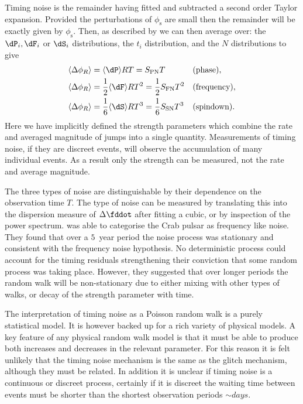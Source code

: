 Timing noise is the remainder having
fitted and subtracted a second order Taylor expansion. Provided the perturbations
of $\phi_{\mathrm{s}}$ are small then the remainder will be exactly given by 
$\phi_{\mathrm{s}}$. Then, as described by \citet{Boynton1972} we can then 
average over: the $\dP_{i}, \dF_{i}$ or $\dS_{i}$
distributions, the $t_{i}$ distribution, and the $N$ distributions to give
\begin{align}
    \langle \Delta\phi_{R} \rangle & = \langle \dP \rangle R T 
    = S_{\mathrm{PN}}T && \mathrm{(phase),} \\
    \langle \Delta\phi_{R} \rangle & = \frac{1}{2}\langle \dF \rangle R T^{2} 
    = \frac{1}{2}S_{\mathrm{FN}}T^{2} && \mathrm{(frequency),} \\
    \langle \Delta\phi_{R} \rangle & = \frac{1}{6}\langle \dS \rangle R T^{3} 
    = \frac{1}{6}S_{\mathrm{SN}}T^{3} && \mathrm{(spindown).} \\
\end{align}
Here we have implicitly defined the strength parameters which combine the rate 
and averaged magnitude of jumps into a single quantity. Measurements of timing 
noise, if they are discreet events, will observe the accumulation of many 
individual events. As a result only the strength can be
measured, not the rate and average magnitude.

The three types of noise are distinguishable by their dependence on the
observation time $T$. The type of noise can be measured by
translating this into the dispersion measure of
$\Delta\fddot$ after fitting a cubic, or by inspection of the power spectrum.
\citet{Boynton1972} was able to categorise the Crab pulsar as frequency like noise.
They found that over a $5$~year period the noise process was stationary
and consistent with the frequency noise hypothesis. No deterministic process
could account for the timing residuals strengthening their conviction that some
random process was taking place.  However, they suggested that over longer periods
the random walk will be non-stationary due to either mixing with other types of
walks, or decay of the strength parameter with time.

The interpretation of timing noise as a Poisson random walk is a purely
statistical model. It is however backed up for a rich variety of physical
models.  A key feature of any physical
random walk model is that it must be able to produce both increases and
decreases in the relevant parameter. For this reason it is felt unlikely that
the timing noise mechanism is the same as the glitch mechanism, although they
must be related.  In addition it is unclear if timing noise is a continuous or
discreet process, certainly if it is discreet the waiting time between events
must be shorter than the shortest observation periods $\sim days$. 

